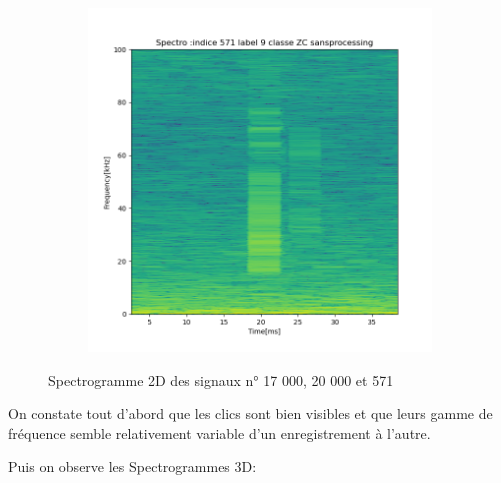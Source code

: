 \begin{figure}[!h]
\begin{subfigure}[b]{0.3\textwidth}
  \end{subfigure}
  \begin{subfigure}[b]{0.3\textwidth}
    \includegraphics[width=\textwidth]{./images/indice571Spectro2Dlabel9classeZCsansprocessingsanszoom.png}
  \end{subfigure}
  \caption{Spectrogramme 2D des signaux n° 17 000, 20 000 et 571}
\end{figure}

On constate tout d'abord que les clics sont bien visibles et que leurs gamme de fréquence semble relativement variable d'un enregistrement à l'autre.

Puis on observe les Spectrogrammes 3D:

